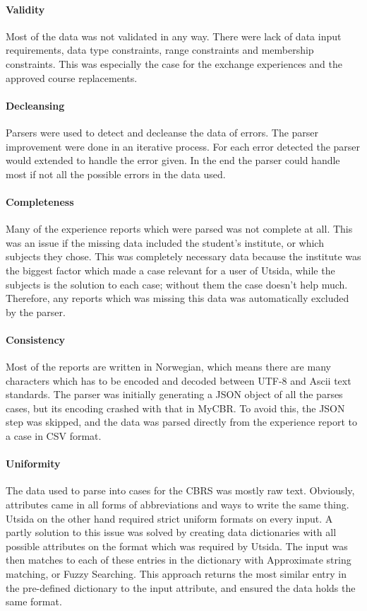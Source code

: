 \paragraph{Validity} Most of the data was not validated in any way. There were lack of data input requirements, data type constraints, range constraints and membership constraints. This was especially the case for the exchange experiences and the approved course replacements.


\paragraph{Decleansing} Parsers were used to detect and decleanse the data of errors. The parser improvement were done in an iterative process. For each error detected the parser would extended to handle the error given. In the end the parser could handle most if not all the possible errors in the data used. 

\paragraph{Completeness}
Many of the experience reports which were parsed was not complete at all. This was an issue if the missing data included the student's institute, or which subjects they chose. This was completely necessary data because the institute was the biggest factor which made a case relevant for a user of Utsida, while the subjects is the solution to each case; without them the case doesn't help much. Therefore, any reports which was missing this data was automatically excluded by the parser.

\paragraph{Consistency}
Most of the reports are written in Norwegian, which means there are many characters which has to be encoded and decoded between UTF-8 and Ascii text standards. The parser was initially generating a JSON object of all the parses cases, but its encoding crashed with that in MyCBR. To avoid this, the JSON step was skipped, and the data was parsed directly from the experience report to a case in CSV format.

\paragraph{Uniformity}
The data used to parse into cases for the CBRS was mostly raw text. Obviously, attributes came in all forms of abbreviations and ways to write the same thing. Utsida on the other hand required strict uniform formats on every input. A partly solution to this issue was solved by creating data dictionaries with all possible attributes on the format which was required by Utsida. The input was then matches to each of these entries in the dictionary with Approximate string matching, or Fuzzy Searching. This approach returns the most similar entry in the pre-defined dictionary to the input attribute, and ensured the data holds the same format. 


